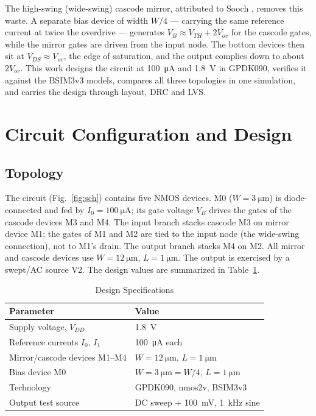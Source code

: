 \documentclass[conference]{IEEEtran}
\begin{document}
The high-swing (wide-swing) cascode mirror, attributed to Sooch \cite{sooch},
removes this waste. A separate bias device of width $W/4$ --- carrying the
same reference current at twice the overdrive --- generates
$V_B \approx V_{TH}+2V_{ov}$ for the cascode gates, while the mirror gates
are driven from the input node. The bottom devices then sit at
$V_{DS}\approx V_{ov}$, the edge of saturation, and the output complies down
to about $2V_{ov}$. This work designs the circuit at \SI{100}{\micro\ampere}
and \SI{1.8}{\volt} in GPDK090, verifies it against the BSIM3v3 models,
compares all three topologies in one simulation, and carries the design
through layout, DRC and LVS.

\section{Circuit Configuration and Design}

\subsection{Topology}
The circuit (Fig.~\ref{fig:sch}) contains five NMOS devices. M0
($W=\SI{3}{\micro\metre}$) is diode-connected and fed by
$I_0=\SI{100}{\micro\ampere}$; its gate voltage $V_B$ drives the gates of the
cascode devices M3 and M4. The input branch stacks cascode M3 on mirror
device M1; the gates of M1 and M2 are tied to the input node (the wide-swing
connection), not to M1's drain. The output branch stacks M4 on M2. All mirror
and cascode devices use $W=\SI{12}{\micro\metre}$, $L=\SI{1}{\micro\metre}$.
The output is exercised by a swept/AC source V2. The design values are
summarized in Table~\ref{tab:spec}.

\begin{table}[!t]
\caption{Design Specifications}
\label{tab:spec}
\centering
\begin{tabular}{ll}
\toprule
Parameter & Value \\
\midrule
Supply voltage, $V_{DD}$ & \SI{1.8}{\volt} \\
Reference currents $I_0$, $I_1$ & \SI{100}{\micro\ampere} each \\
Mirror/cascode devices M1--M4 & $W=\SI{12}{\micro\metre}$, $L=\SI{1}{\micro\metre}$ \\
Bias device M0 & $W=\SI{3}{\micro\metre}=W/4$, $L=\SI{1}{\micro\metre}$ \\
Technology & GPDK090, nmos2v, BSIM3v3 \\
Output test source & DC sweep + \SI{100}{\milli\volt}, \SI{1}{\kilo\hertz} sine \\
\bottomrule
\end{tabular}
\end{table}
\end{document}
